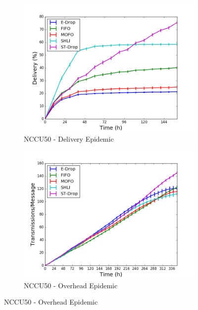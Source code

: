 \begin{figure}
    \begin{subfigure}[b]{0.5\columnwidth}
        \includegraphics[width=\linewidth]{imgs/nccu/50/Epidemic-delivery.png}
        \caption{NCCU50 - Delivery Epidemic}
        \label{fig:nccu50EpidemicDel}
    \end{subfigure}
    \hfill %
    \begin{subfigure}[b]{0.5\columnwidth}
        \includegraphics[width=\linewidth]{imgs/nccu/50/Epidemic-overhead.png}
        \caption{NCCU50 - Overhead Epidemic}
        \label{fig:nccu50EpidemicOver}
    \end{subfigure}


\end{figure}
